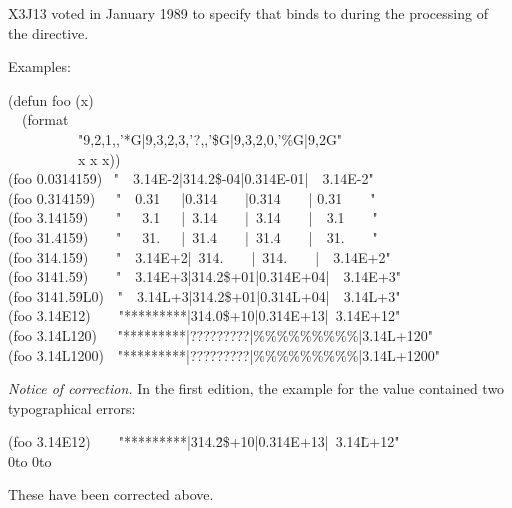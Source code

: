\begin{flushdesc}
\begin{new}
X3J13 voted in January 1989
to specify that  binds  to 
during the processing of the  directive.
\end{new}
\begin{obsolete}
Examples:
\begin{lisp}
(defun foo (x) \\
~~(format {\nil} \\
~~~~~~~~~~"{\Xtilde}9,2,1,,'*G|{\Xtilde}9,3,2,3,'?,,'\$G|{\Xtilde}9,3,2,0,'\%G|{\Xtilde}9,2G" \\
~~~~~~~~~~x x x)) \\[10pt]
(foo 0.0314159) \EV\ "~~3.14E-2|314.2\$-04|0.314E-01|~~3.14E-2" \\
(foo 0.314159)~~\EV\ "~~0.31~~~|0.314~~~~|0.314~~~~| 0.31~~~~" \\
(foo 3.14159)~~~\EV\ "~~~3.1~~~|~3.14~~~~|~3.14~~~~|~~3.1~~~~" \\
(foo 31.4159)~~~\EV\ "~~~31.~~~|~31.4~~~~|~31.4~~~~|~~31.~~~~" \\
(foo 314.159)~~~\EV\ "~~3.14E+2|~314.~~~~|~314.~~~~|~~3.14E+2" \\
(foo 3141.59)~~~\EV\ "~~3.14E+3|314.2\$+01|0.314E+04|~~3.14E+3" \\
(foo 3141.59L0)~\EV\ "~~3.14L+3|314.2\$+01|0.314L+04|~~3.14L+3" \\
(foo 3.14E12)~~~\EV\ "*********|314.0\$+10|0.314E+13|~3.14E+12" \\
(foo 3.14L120)~~\EV\ "*********|?????????|\%\%\%\%\%\%\%\%\%|3.14L+120" \\
(foo 3.14L1200)~\EV\ "*********|?????????|\%\%\%\%\%\%\%\%\%|3.14L+1200"
\end{lisp}
\end{obsolete}
\newpage%
\begin{new}%
{\it Notice of correction.}
In the first edition, the example for the value  contained two
typographical errors:
\begin{lisp}
(foo 3.14E12)~~~\EV\ "*********|314.\=2\$+10|0.314E+13|~3.14\=L+12" \\
\>\hbox{0}\hbox to \>\hbox{0}\hbox to  \\
\end{lisp}
These have been corrected above.
\end{new}


\end{flushdesc}
